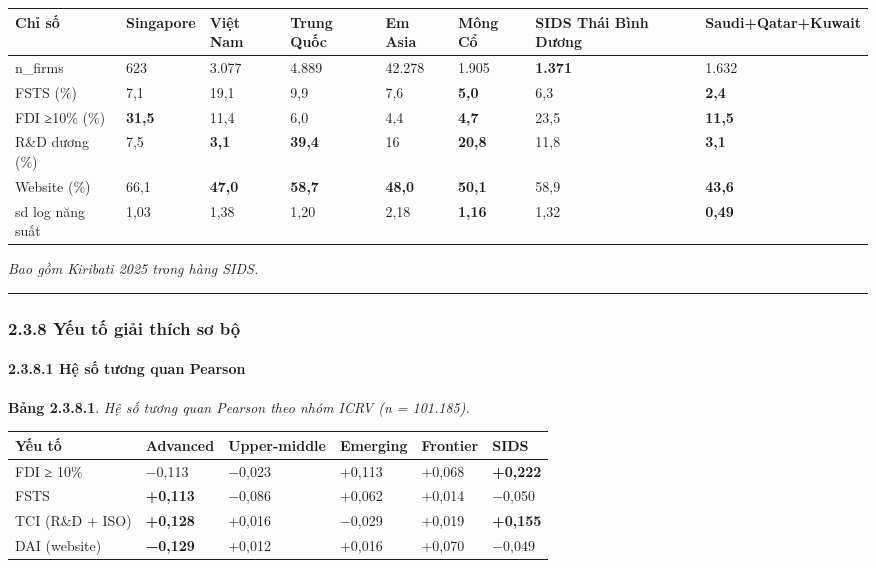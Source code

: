 \documentclass[12pt,a4paper]{article}
\begin{document}
\begin{longtable}[]{@{}llllllll@{}}
\toprule\noalign{}
Chỉ số & Singapore & Việt Nam & Trung Quốc & Em Asia & Mông Cổ & SIDS
Thái Bình Dương & Saudi+Qatar+Kuwait \\
\midrule\noalign{}
\endhead
\bottomrule\noalign{}
\endlastfoot
n\_firms & 623 & 3.077 & 4.889 & 42.278 & 1.905 & \textbf{1.371} &
1.632 \\
FSTS (\%) & 7,1 & 19,1 & 9,9 & 7,6 & \textbf{5,0} & 6,3 &
\textbf{2,4} \\
FDI ≥10\% (\%) & \textbf{31,5} & 11,4 & 6,0 & 4,4 & \textbf{4,7} & 23,5
& \textbf{11,5} \\
R\&D dương (\%) & 7,5 & \textbf{3,1} & \textbf{39,4} & 16 &
\textbf{20,8} & 11,8 & \textbf{3,1} \\
Website (\%) & 66,1 & \textbf{47,0} & \textbf{58,7} & \textbf{48,0} &
\textbf{50,1} & 58,9 & \textbf{43,6} \\
sd log năng suất & 1,03 & 1,38 & 1,20 & 2,18 & \textbf{1,16} & 1,32 &
\textbf{0,49} \\
\end{longtable}

\emph{Bao gồm Kiribati 2025 trong hàng SIDS.}

\begin{center}\rule{0.5\linewidth}{0.5pt}\end{center}

\hypertarget{238-yux1ebfu-tux1ed1-giux1ea3i-thuxedch-sux1a1-bux1ed9}{%
\subsubsection{2.3.8 Yếu tố giải thích sơ
bộ}\label{238-yux1ebfu-tux1ed1-giux1ea3i-thuxedch-sux1a1-bux1ed9}}

\hypertarget{2381-hux1ec7-sux1ed1-tux1b0ux1a1ng-quan-pearson}{%
\paragraph{2.3.8.1 Hệ số tương quan
Pearson}\label{2381-hux1ec7-sux1ed1-tux1b0ux1a1ng-quan-pearson}}

\textbf{Bảng 2.3.8.1}. \emph{Hệ số tương quan Pearson theo nhóm ICRV (n
= 101.185).}

\begin{longtable}[]{@{}llllll@{}}
\toprule\noalign{}
Yếu tố & Advanced & Upper-middle & Emerging & Frontier & SIDS \\
\midrule\noalign{}
\endhead
\bottomrule\noalign{}
\endlastfoot
FDI ≥ 10\% & −0,113 & −0,023 & +0,113 & +0,068 & \textbf{+0,222} \\
FSTS & \textbf{+0,113} & −0,086 & +0,062 & +0,014 & −0,050 \\
TCI (R\&D + ISO) & \textbf{+0,128} & +0,016 & −0,029 & +0,019 &
\textbf{+0,155} \\
DAI (website) & \textbf{−0,129} & +0,012 & +0,016 & +0,070 & −0,049 \\
\end{longtable}
\end{document}
